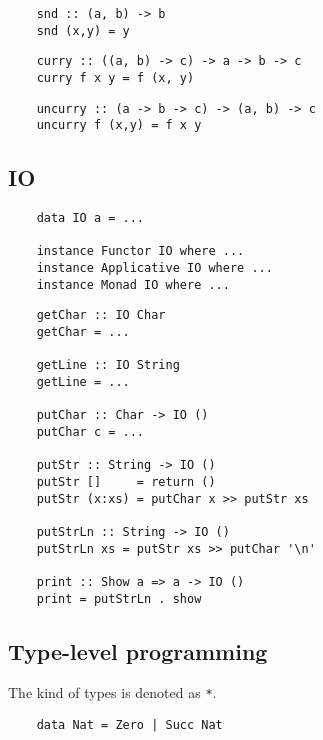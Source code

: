 \begin{multicols}{2}
	\begin{verbatim}
	snd :: (a, b) -> b
	snd (x,y) = y
	\end{verbatim}
	
	\begin{verbatim}
	curry :: ((a, b) -> c) -> a -> b -> c 
	curry f x y = f (x, y)
	\end{verbatim}
	
	\begin{verbatim}
	uncurry :: (a -> b -> c) -> (a, b) -> c
	uncurry f (x,y) = f x y
	\end{verbatim}
	
	\subsection*{IO}
	
	\begin{verbatim}
	data IO a = ...
	
	instance Functor IO where ...
	instance Applicative IO where ...
	instance Monad IO where ...
	\end{verbatim}
	
	\begin{verbatim}
	getChar :: IO Char
	getChar = ...
	
	getLine :: IO String
	getLine = ...
	
	putChar :: Char -> IO ()
	putChar c = ...
	
	putStr :: String -> IO ()
	putStr []     = return ()
	putStr (x:xs) = putChar x >> putStr xs
	
	putStrLn :: String -> IO ()
	putStrLn xs = putStr xs >> putChar '\n'
	
	print :: Show a => a -> IO ()
	print = putStrLn . show
	\end{verbatim}
	
	\subsection*{Type-level programming}
	
	The kind of types is denoted as \texttt{*}. 
	
	\begin{verbatim}
	data Nat = Zero | Succ Nat
	\end{verbatim}
\end{multicols}
